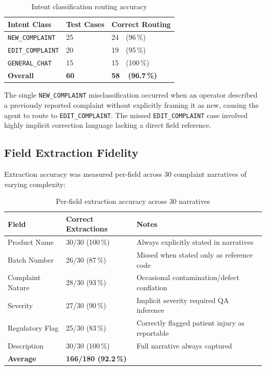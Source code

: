 \documentclass[12pt,a4paper]{report}
\begin{document}
\begin{table}[H]
\centering
\caption{Intent classification routing accuracy}
\begin{tabular}{p{}p{}p{}}
\toprule
\textbf{Intent Class} & \textbf{Test Cases} & \textbf{Correct Routing} \\
\midrule
\texttt{NEW\_COMPLAINT}  & 25 & 24\ \ (96\,\%) \\
\texttt{EDIT\_COMPLAINT} & 20 & 19\ \ (95\,\%) \\
\texttt{GENERAL\_CHAT}   & 15 & 15\ \ (100\,\%) \\
\midrule
\textbf{Overall} & \textbf{60} & \textbf{58\ \ (96.7\,\%)} \\
\bottomrule
\end{tabular}
\end{table}

The single \texttt{NEW\_COMPLAINT} misclassification occurred when an operator described a previously reported complaint without explicitly framing it as new, causing the agent to route to \texttt{EDIT\_COMPLAINT}. The missed \texttt{EDIT\_COMPLAINT} case involved highly implicit correction language lacking a direct field reference.

\subsection{Field Extraction Fidelity}

Extraction accuracy was measured per-field across 30 complaint narratives of varying complexity:

\begin{table}[H]
\centering
\caption{Per-field extraction accuracy across 30 narratives}
\begin{tabular}{p{}p{}p{}}
\toprule
\textbf{Field} & \textbf{Correct Extractions} & \textbf{Notes} \\
\midrule
Product Name      & 30/30 (100\,\%) & Always explicitly stated in narratives \\
Batch Number      & 26/30 (87\,\%)  & Missed when stated only as reference code \\
Complaint Nature  & 28/30 (93\,\%)  & Occasional contamination/defect conflation \\
Severity          & 27/30 (90\,\%)  & Implicit severity required QA inference \\
Regulatory Flag   & 25/30 (83\,\%)  & Correctly flagged patient injury as reportable \\
Description       & 30/30 (100\,\%) & Full narrative always captured \\
\midrule
\textbf{Average}  & \textbf{166/180 (92.2\,\%)} & \\
\bottomrule
\end{tabular}
\end{table}
\end{document}
